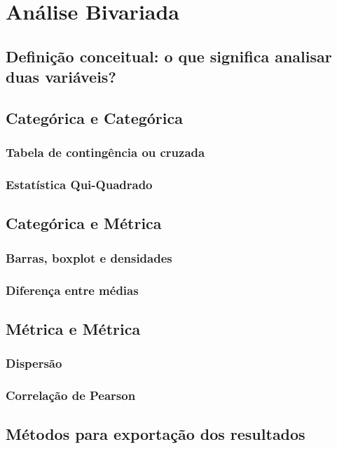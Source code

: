 \documentclass[a4paper,12pt]{article}
\begin{document}
\pagebreak

\section*{Análise Bivariada}
\subsection*{Definição conceitual: o que significa analisar duas variáveis?}
\subsection*{Categórica e Categórica}
\subsubsection*{Tabela de contingência ou cruzada}
\subsubsection*{Estatística Qui-Quadrado}

\subsection*{Categórica e Métrica}
\subsubsection*{Barras, boxplot e densidades}
\subsubsection*{Diferença entre médias}

\subsection*{Métrica e Métrica}

\subsubsection*{Dispersão}
\subsubsection*{Correlação de Pearson}

\subsection*{Métodos para exportação dos resultados}
\end{document}
